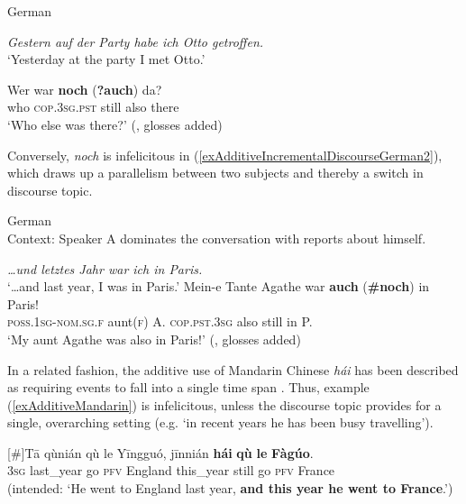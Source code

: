 \begin{exe}
	\ex German\label{exAdditiveIncrementalDiscourseGerman1}
	\begin{xlist}
		 \textit{Gestern auf der Party habe ich Otto getroffen.}\\
		\lq Yesterday at the party I met Otto.\rq{}
		
		 \gll Wer war \textbf{noch} \textup{(\textbf{?}}\textbf{auch}\textup{)} da?\\
		who \textsc{cop}.3\textsc{sg}.\textsc{pst} still \phantom{?(}also there\\
		\glt \lq Who else was there?\rq{ }(\cite[1857]{Umbach2012}, glosses added)
	\end{xlist}
\end{exe}

Conversely, \textit{noch} is infelicitous in (\ref{exAdditiveIncrementalDiscourseGerman2}), which draws up a parallelism between two subjects and thereby a switch in discourse topic.

\begin{exe}
	\ex German\label{exAdditiveIncrementalDiscourseGerman2}\\
	Context: Speaker A dominates the conversation with reports about himself.
	\begin{xlist}
		 \textit{…und letztes Jahr war ich in Paris.}\\
		\lq{}…and last year, I was in Paris.\rq{}
		\exi{B:}
		\gll Mein-e Tante Agathe war \textbf{auch} \textup{(\textbf{\#}}\textbf{noch}\textup{)} in Paris!\\
		\textsc{poss}.1\textsc{sg}-\textsc{nom}.\textsc{sg}.\textsc{f} aunt(\textsc{f}) A. \textsc{cop}.\textsc{pst}.3\textsc{sg} also \phantom{(\#}still in P.\\
		\glt \lq My aunt Agathe was also in Paris!\rq{ }(\cite[82]{Eckardt2006}, glosses added)
	\end{xlist}		
\end{exe}

In a related fashion, the additive use of Mandarin Chinese \textit{hái} has been described as requiring events to fall into a single time span \parencite{JingSchmidtGries2009}. Thus, example (\ref{exAdditiveMandarin}) is infelicitous, unless the discourse topic provides for a single, overarching setting (e.g. \lq in recent years he has been busy travelling\rq{}).

\begin{exe}
	\exi{}[\#]{\gll Tā qùnián qù le Yīngguó, jīnnián \textbf{hái} \textbf{qù} \textbf{le} \textbf{Fàgúo}.\\
	3\textsc{sg} last\_year go \textsc{pfv} England this\_year still go \textsc{pfv} France\\
	\glt (intended: \lq He went to England last year, \textbf{and this year he went to France}.\rq{}) \parencite[39]{JingSchmidtGries2009}}
\end{exe}

